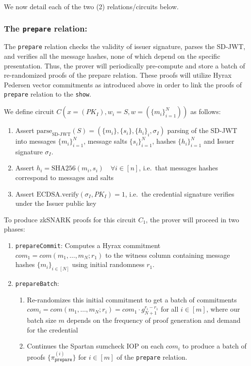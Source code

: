 We now detail each of the two (2) relations/circuits below.

\subsubsection{The \texttt{prepare} relation:}

The \texttt{prepare} relation checks the validity of issuer signature, parses the SD-JWT, and verifies all the message hashes, none of which depend on the specific presentation. 
Thus, the prover will periodically pre-compute and store a batch of re-randomized proofs of the prepare relation. 
These proofs will utilize Hyrax Pedersen vector commitments as introduced above in order to link the proofs of \texttt{prepare} relation to the \texttt{show}. 

\begin{mdframed}[style=zkprotocolwithheader, frametitle=Circuit $C_1$ for the \texttt{prepare} relation]

We define circuit $C(x = (PK_I), w_i = S, w = (\{m_i\}_{i=1}^N))$ as follows:

\begin{enumerate}
\item Assert $\text{parse}_{\text{SD-JWT}}(S) = (\{m_i\}, \{s_i\}, \{h_i\}_i, \sigma_I)$ parsing of the SD-JWT into messages $\{m_i\}_{i=1}^N$, message salts $\{s_i\}_{i=1}^N$, hashes $\{h_i\}_{i=1}^N$ and Issuer signature $\sigma_I$.
\item Assert $h_i = \text{SHA256}(m_i, s_i) \quad \forall i \in [n]$, i.e.\ that messages hashes correspond to messages and salts
\item Assert $\text{ECDSA.verify}(\sigma_I, PK_I) = 1$, i.e.\ the credential signature verifies under the Issuer public key
\end{enumerate}

\end{mdframed}

To produce zkSNARK proofs for this circuit $C_1$, the prover will proceed in two phases:
\begin{enumerate}
\item \texttt{prepareCommit}: Computes a Hyrax commitment $com_1 = com(m_1, \dots, m_N; r_1)$ to the witness column containing message hashes $\{m_i\}_{i \in [N]}$ using initial randomness $r_1$. 
\item \texttt{prepareBatch}: 
    \begin{enumerate}
        \item Re-randomizes this initial commitment to get a batch of commitments $com_i = com(m_1, \dots, m_N; r_i) = com_1 \cdot g_{N+1}^{r_i-r_1}$ for all $i \in [m]$, 
        where our batch size $m$ depends on the frequency of proof generation and demand for the credential
        \item Continues the Spartan sumcheck IOP on each $com_i$ to produce a batch of proofs $\{\pi_{\texttt{prepare}}^{(i)}\}$ for $i \in [m]$ of the \texttt{prepare} relation.
    \end{enumerate}
\end{enumerate}
    
